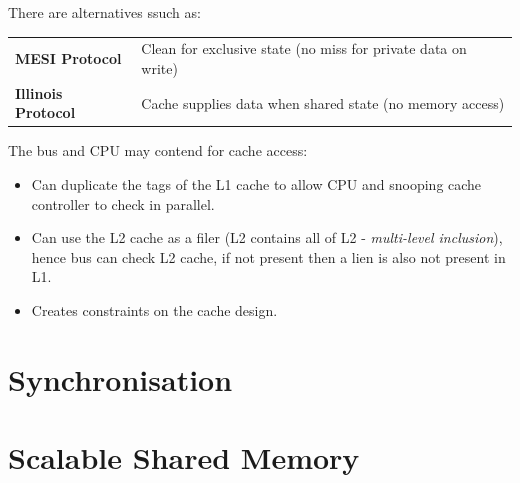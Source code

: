 There are alternatives ssuch as:
\begin{center}
	\begin{tabular}{l p{}}
		\textbf{MESI Protocol}     & Clean for exclusive state (no miss for private data on write) \\
		\textbf{Illinois Protocol} & Cache supplies data when shared state (no memory access)      \\
	\end{tabular}
\end{center}
The bus and CPU may contend for cache access:
\begin{itemize}
	\item Can duplicate the tags of the L1 cache to allow CPU and snooping cache controller to check in parallel.
	\item Can use the L2 cache as a filer (L2 contains all of L2 - \textit{multi-level inclusion}), hence bus can check L2 cache, if not present then a lien is also not present in L1.
	\item Creates constraints on the cache design.
\end{itemize}

\section{Synchronisation}
\unfinished

\section{Scalable Shared Memory}
\unfinished